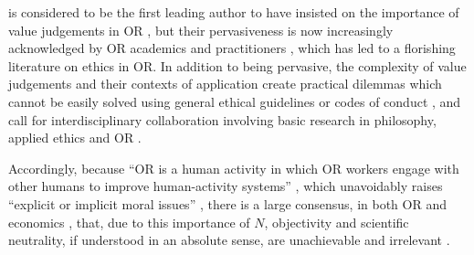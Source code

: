 \documentclass[preprint, french, english, 11pt, authoryear]{elsarticle}%
\begin{document}
\begin{changebar}
\citet{churchman_operations_1970} is considered to be the first leading author to have insisted on the importance of value judgements in \ac{OR} \citep{ormerod_operational_2013}, but their pervasiveness is now increasingly acknowledged by \ac{OR} academics and practitioners \citep{brans_ethics_2007}, which has led to a florishing literature on ethics in \ac{OR}. 
In addition to being pervasive, the complexity of value judgements and their contexts of application create practical dilemmas which cannot be easily solved using general ethical guidelines or codes of conduct \citep{taket_undercover_1994}, and call for interdisciplinary collaboration involving basic research in philosophy, applied ethics and \ac{OR} \citep{picavet_opportunities_2009}. \end{changebar}Accordingly, because ``\ac{OR}  
is a human activity in which \ac{OR} 
workers engage with other humans to improve human-activity systems'' \citep{ormerod_operational_2013}, which unavoidably raises ``explicit or implicit moral issues'' \citep{diekmann_moral_2013}, there is a large consensus, in both \ac{OR} 
\citep[p. 285]{williams_2009} and economics \citep{dwyer_scientific_1985, heath_value_1994, sen_rationality_2004, mongin_value_2006, baujard_value_2013},
that, due to this importance of $N$, objectivity and scientific neutrality, if understood in an absolute sense, are unachievable and irrelevant \citep{le_menestrel_ethics_2004,reisach_creation_2016}. 
\end{document}

